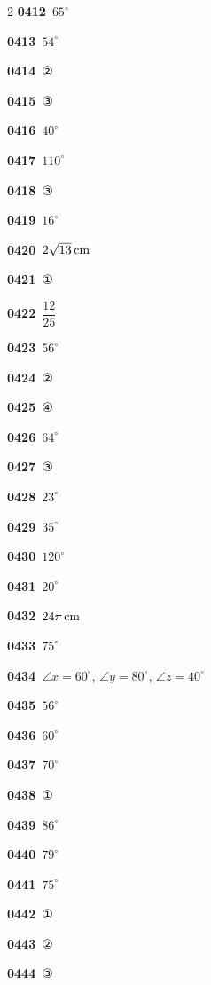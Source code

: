 \documentclass[10pt,a4paper]{article}
\begin{document}
\begin{multicols}{2}
\noindent\textbf{0412}\ $65^\circ$\par
\noindent\textbf{0413}\ $54^\circ$\par
\noindent\textbf{0414}\ ②\par
\noindent\textbf{0415}\ ③\par
\noindent\textbf{0416}\ $40^\circ$\par
\noindent\textbf{0417}\ $110^\circ$\par
\noindent\textbf{0418}\ ③\par
\noindent\textbf{0419}\ $16^\circ$\par
\noindent\textbf{0420}\ $2\sqrt{13}\mkern3mu \mathrm{cm}$\par
\noindent\textbf{0421}\ ①\par
\noindent\textbf{0422}\ $\dfrac{12}{25}$\par
\noindent\textbf{0423}\ $56^\circ$\par
\noindent\textbf{0424}\ ②\par
\noindent\textbf{0425}\ ④\par
\noindent\textbf{0426}\ $64^\circ$\par
\noindent\textbf{0427}\ ③\par
\noindent\textbf{0428}\ $23^\circ$\par
\noindent\textbf{0429}\ $35^\circ$\par
\noindent\textbf{0430}\ $120^\circ$\par
\noindent\textbf{0431}\ $20^\circ$\par
\noindent\textbf{0432}\ $24\pi\mkern3mu \mathrm{cm}$\par
\noindent\textbf{0433}\ $75^\circ$\par
\noindent\textbf{0434}\ $\angle x=60^\circ$, $\angle y=80^\circ$, $\angle z=40^\circ$\par
\noindent\textbf{0435}\ $56^\circ$\par
\noindent\textbf{0436}\ $60^\circ$\par
\noindent\textbf{0437}\ $70^\circ$\par
\noindent\textbf{0438}\ ①\par
\noindent\textbf{0439}\ $86^\circ$\par
\noindent\textbf{0440}\ $79^\circ$\par
\noindent\textbf{0441}\ $75^\circ$\par
\noindent\textbf{0442}\ ①\par
\noindent\textbf{0443}\ ②\par
\noindent\textbf{0444}\ ③\par

\end{multicols}
\end{document}
